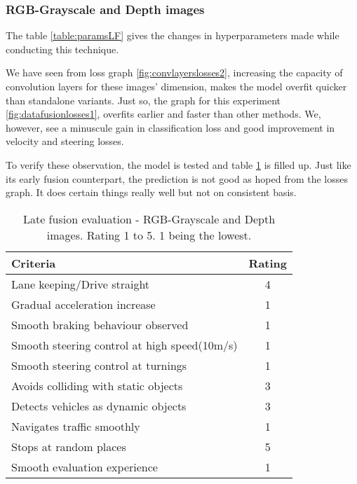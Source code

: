 \subsubsection*{RGB-Grayscale and Depth images}

The table \ref{table:paramsLF} gives the changes in hyperparameters made while conducting
this technique.

We have seen from loss graph \ref{fig:convlayerslosses2}, increasing the capacity of
convolution layers for these images' dimension, makes the model overfit quicker than
standalone variants. Just so, the graph for this experiment \ref{fig:datafusionlosses1},
overfits earlier and faster than other methods. We, however, see a minuscule gain in
classification loss and good improvement in velocity and steering losses.

To verify these observation, the model is tested and table \ref{table:latefusionrgbdepth}
is filled up. Just like its early fusion counterpart, the prediction is not good as hoped
from the losses graph. It does certain things really well but not on consistent basis.
\begin{table}[!ht]
    \centering
\begin{tabular}{lc}
    \toprule
    Criteria & Rating \\\midrule
    Lane keeping/Drive straight  & 4  \\
    Gradual acceleration increase  & 1\\
    Smooth braking behaviour observed & 1 \\
    Smooth steering control at high speed(10m/s) & 1 \\
    Smooth steering control at turnings & 1\\
    Avoids colliding with static objects & 3 \\
    Detects vehicles as dynamic objects & 3 \\
    Navigates traffic smoothly & 1\\
    Stops at random places & 5 \\
    Smooth evaluation experience & 1 \\\bottomrule
\end{tabular}
\caption{Late fusion evaluation - RGB-Grayscale and Depth images. Rating 1 to 5. 1 being
the lowest.}
\label{table:latefusionrgbdepth}
\end{table}

